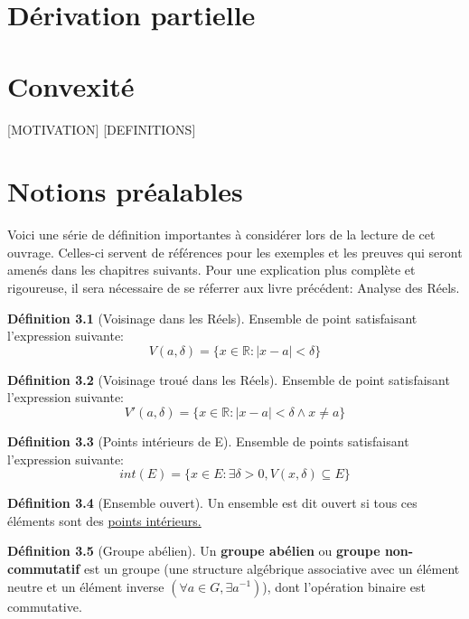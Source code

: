 \documentclass[12pt]{book}
\let\Bbb\mathbb
\theoremstyle{definition}
\newtheorem{definition}{Définition}[section]
\begin{document}
\chapter{Dérivation partielle}

\chapter{Convexité}
[MOTIVATION]
[DEFINITIONS]
\appendix
\chapter{Notions préalables}
Voici une série de définition importantes à considérer lors de la lecture de cet ouvrage. Celles-ci servent
de références pour les exemples et les preuves qui seront amenés dans les chapitres suivants. Pour une explication
plus complète et rigoureuse, il sera nécessaire de se réferrer aux livre précédent: Analyse des Réels.

\begin{definition}[Voisinage dans les Réels]
    \label{def:voisinage_reels}
    Ensemble de point satisfaisant l'expression
    suivante: $$V(a, \delta) = \{ x \in \Bbb R : |x - a| < \delta \}$$
\end{definition}

\begin{definition}[Voisinage troué dans les Réels]
    \label{def:voisinage_troue_reels}
    Ensemble de point satisfaisant l'expression
    suivante: $$V'(a, \delta) = \{ x \in \Bbb R : |x - a| < \delta \land x \neq a \}$$
\end{definition}

\begin{definition}[Points intérieurs de E]
    \label{def:point_int}
    Ensemble de points satisfaisant l'expression
    suivante: $$int(E) = \{ x \in E : \exists \delta > 0, V(x, \delta) \subseteq E \} $$
\end{definition}

\begin{definition}[Ensemble ouvert]
    \label{def:ensemble_ouvert}
    Un ensemble est dit ouvert si tous ces éléments sont des \hyperref[def:point_int]{points intérieurs.}
\end{definition}

\begin{definition}[Groupe abélien]
    \label{def:groupe_abelien}
    Un \textbf{groupe abélien} ou \textbf{groupe non-commutatif} est un groupe
    (une structure algébrique associative avec un élément neutre et un élément inverse $(\forall a \in G, \exists a^{-1})$), 
    dont l'opération binaire est commutative.
\end{definition}
\end{document}
